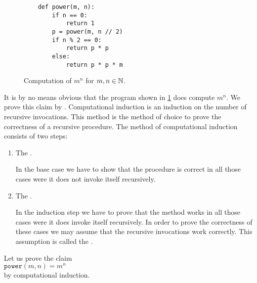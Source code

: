 \begin{figure}[!h]
  \centering
\begin{verbatim}
    def power(m, n):
        if n == 0:
            return 1
        p = power(m, n // 2)
        if n % 2 == 0:
            return p * p
        else:
            return p * p * m
\end{verbatim}
\vspace*{-0.3cm}
  \caption{Computation of $m^n$ for $m,n \in {\mathbb N}$.}
  \label{fig:power.stlx}
\end{figure} 

It is by no means obvious that the program shown in \ref{fig:power.stlx} does compute
$m^n$.  We prove this claim by  .
Computational induction is an induction on the number of recursive invocations.
This method is the method of choice to prove the correctness of a recursive procedure.
The method of computational induction consists of two steps:
\begin{enumerate}
\item The .

      In the base case we have to show that the procedure is correct in all those cases were it
      does not invoke itself recursively.
\item The .

      In the induction step we have to prove that the method works in all those cases were
      it does invoke itself recursively.  In order to prove the correctness of these cases we may
      assume that the recursive invocations work correctly.  This assumption is called the
      .
\end{enumerate}
Let us prove the claim 
\\[0.2cm]
\hspace*{1.3cm}
 $\mathtt{power}(m,n) = m^n$
\\[0.2cm] 
by computational induction.
